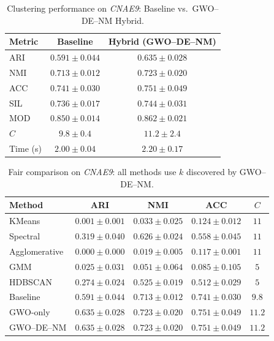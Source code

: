 \begin{table}[htbp]
\centering
\caption{Clustering performance on \textit{CNAE9}: Baseline vs.\ GWO--DE--NM Hybrid.}
\label{tab:cnae9}
\begin{tabular}{lcc}
\toprule
Metric & Baseline & Hybrid (GWO--DE--NM) \\
\midrule
ARI & $0.591 \pm 0.044$ & $\mathbf{0.635 \pm 0.028}$ \\
NMI & $0.713 \pm 0.012$ & $\mathbf{0.723 \pm 0.020}$ \\
ACC & $0.741 \pm 0.030$ & $\mathbf{0.751 \pm 0.049}$ \\
SIL & $0.736 \pm 0.017$ & $\mathbf{0.744 \pm 0.031}$ \\
MOD & $0.850 \pm 0.014$ & $\mathbf{0.862 \pm 0.021}$ \\
\midrule
$C$ & $9.8 \pm 0.4$ & $11.2 \pm 2.4$ \\
Time (s) & $2.00 \pm 0.04$ & $2.20 \pm 0.17$ \\
\bottomrule
\end{tabular}
\end{table}

\begin{table}[htbp]
\centering\small
\caption{Fair comparison on \textit{CNAE9}: all methods use $k$ discovered by GWO--DE--NM.}
\label{tab:fair_cnae9}
\begin{tabular}{lcccc}
\toprule
Method & ARI & NMI & ACC & $C$ \\
\midrule
KMeans & $0.001 \pm 0.001$ & $0.033 \pm 0.025$ & $0.124 \pm 0.012$ & $11$ \\
Spectral & $0.319 \pm 0.040$ & $0.626 \pm 0.024$ & $0.558 \pm 0.045$ & $11$ \\
Agglomerative & $0.000 \pm 0.000$ & $0.019 \pm 0.005$ & $0.117 \pm 0.001$ & $11$ \\
GMM & $0.025 \pm 0.031$ & $0.051 \pm 0.064$ & $0.085 \pm 0.105$ & $5$ \\
HDBSCAN & $0.274 \pm 0.024$ & $0.525 \pm 0.019$ & $0.512 \pm 0.029$ & $5$ \\
\midrule
Baseline & $0.591 \pm 0.044$ & $0.713 \pm 0.012$ & $0.741 \pm 0.030$ & $9.8$ \\
GWO-only & $\mathbf{0.635 \pm 0.028}$ & $0.723 \pm 0.020$ & $0.751 \pm 0.049$ & $11.2$ \\
GWO--DE--NM & $0.635 \pm 0.028$ & $0.723 \pm 0.020$ & $0.751 \pm 0.049$ & $11.2$ \\
\bottomrule
\end{tabular}
\end{table}

